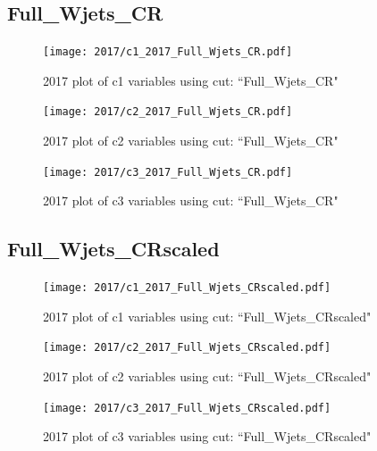 \documentclass{article}
\begin{document}
      \subsection*{Full\_Wjets\_CR}
                        \begin{figure}[H]
                            \centering
                            \caption{2017 plot of c1 variables using cut: ``Full\_Wjets\_CR"}
                            \texttt{[image: 2017/c1\_2017\_Full\_Wjets\_CR.pdf]}
                        \end{figure}    
                        \begin{figure}[H]
                            \centering
                            \caption{2017 plot of c2 variables using cut: ``Full\_Wjets\_CR"}
                            \texttt{[image: 2017/c2\_2017\_Full\_Wjets\_CR.pdf]}
                        \end{figure}    
                        \begin{figure}[H]
                            \centering
                            \caption{2017 plot of c3 variables using cut: ``Full\_Wjets\_CR"}
                            \texttt{[image: 2017/c3\_2017\_Full\_Wjets\_CR.pdf]}
                        \end{figure}    
      \subsection*{Full\_Wjets\_CRscaled}
                        \begin{figure}[H]
                            \centering
                            \caption{2017 plot of c1 variables using cut: ``Full\_Wjets\_CRscaled"}
                            \texttt{[image: 2017/c1\_2017\_Full\_Wjets\_CRscaled.pdf]}
                        \end{figure}    
                        \begin{figure}[H]
                            \centering
                            \caption{2017 plot of c2 variables using cut: ``Full\_Wjets\_CRscaled"}
                            \texttt{[image: 2017/c2\_2017\_Full\_Wjets\_CRscaled.pdf]}
                        \end{figure}    
                        \begin{figure}[H]
                            \centering
                            \caption{2017 plot of c3 variables using cut: ``Full\_Wjets\_CRscaled"}
                            \texttt{[image: 2017/c3\_2017\_Full\_Wjets\_CRscaled.pdf]}
                        \end{figure}    
\end{document}
